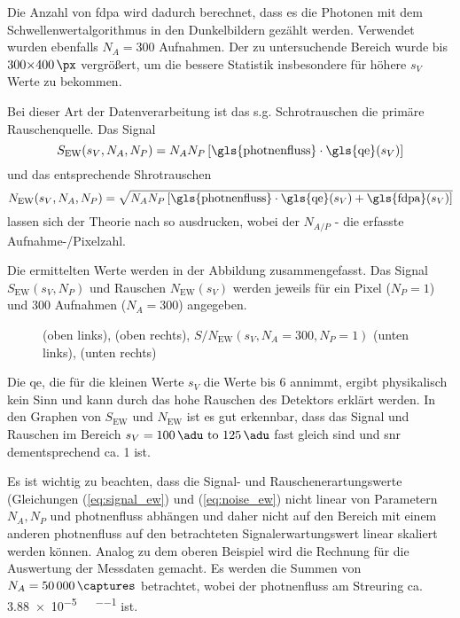\noindent
Die Anzahl von \gls{fdpa} wird dadurch berechnet, dass es die Photonen mit dem Schwellenwertalgorithmus in den Dunkelbildern gezählt werden. Verwendet wurden ebenfalls $N_A = 300$ Aufnahmen. Der zu untersuchende Bereich wurde bis $300{\times}\SI{400}{\px}$ vergrößert, um die bessere Statistik insbesondere für höhere $s_V$ Werte zu bekommen.

\noindent
Bei dieser Art der Datenverarbeitung ist das s.g. Schrotrauschen die primäre Rauschenquelle. Das Signal 
\begin{equation}
        S_{\text{EW}}(s_V, N_A, N_P) = N_{A}N_{P}\left[\text{\gls{photnenfluss}}\cdot\text{\gls{qe}}(s_V)\right]
        \label{eq:signal_ew}
\end{equation}
und das entsprechende Shrotrauschen 
\begin{equation}
        N_{\text{EW}}(s_V, N_A, N_P) = \sqrt{N_{A}N_{P}\left[\text{\gls{photnenfluss}}\cdot\text{\gls{qe}}(s_V) + \text{\gls{fdpa}}(s_V)\right]}
        \label{eq:noise_ew}
\end{equation}
lassen sich der Theorie nach so ausdrucken, wobei der $N_{A/P}$ - die erfasste Aufnahme-/Pixelzahl. 

\noindent
Die ermittelten Werte werden in der Abbildung zusammengefasst. Das Signal $S_{\text{EW}}(s_V, N_P)$ und Rauschen $ N_{\text{EW}}(s_V)$ werden jeweils für ein Pixel ($N_P = 1$) und 300 Aufnahmen ($N_A = 300$) angegeben.
\begin{figure}[H]
    \centering
    
    \caption{(oben links), (oben rechts), $S/N_{\text{EW}}(s_V, N_A = 300, N_P = 1)$ (unten links), (unten rechts)}
    \label{fig:qe_fehldetektiert_signal_noise}
\end{figure}
\noindent
Die \gls{qe}, die für die kleinen Werte $s_V$ die Werte bis 6 annimmt, ergibt physikalisch kein Sinn und kann durch das hohe Rauschen des Detektors erklärt werden. In den Graphen von $S_{\text{EW}}$ und $N_{\text{EW}}$ ist es gut erkennbar, dass das Signal und Rauschen im Bereich $s_V = \text{\SIrange{100}{125}{\adu}}$ fast gleich sind und \gls{snr} dementsprechend ca. 1 ist.

\noindent
Es ist wichtig zu beachten, dass die Signal- und Rauschenerartungswerte (Gleichungen (\ref{eq:signal_ew}) und  (\ref{eq:noise_ew}) nicht linear von Parametern $N_A, N_P$ und \gls{photnenfluss} abhängen und daher nicht auf den Bereich mit einem anderen \gls{photnenfluss} auf den betrachteten Signalerwartungswert linear skaliert werden können. Analog zu dem oberen Beispiel wird die Rechnung für die Auswertung der Messdaten gemacht. Es werden die Summen von $N_A = \SI{50000}{\captures}$ betrachtet, wobei der \gls{photnenfluss} am Streuring ca. \SI{3.88e-5}{\photons\per\pixel\per\capture} ist.

